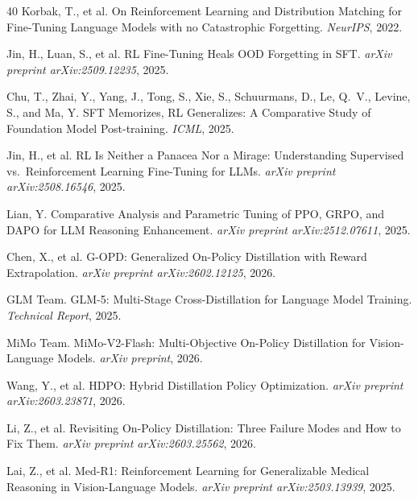 \documentclass{article}
\begin{document}
\begin{thebibliography}{40}
Korbak, T., et al.
\newblock On Reinforcement Learning and Distribution Matching for Fine-Tuning Language Models with no Catastrophic Forgetting.
\newblock \emph{NeurIPS}, 2022.

Jin, H., Luan, S., et al.
\newblock RL Fine-Tuning Heals OOD Forgetting in SFT.
\newblock \emph{arXiv preprint arXiv:2509.12235}, 2025.

Chu, T., Zhai, Y., Yang, J., Tong, S., Xie, S., Schuurmans, D., Le, Q.~V., Levine, S., and Ma, Y.
\newblock SFT Memorizes, RL Generalizes: A Comparative Study of Foundation Model Post-training.
\newblock \emph{ICML}, 2025.

Jin, H., et al.
\newblock RL Is Neither a Panacea Nor a Mirage: Understanding Supervised vs.\ Reinforcement Learning Fine-Tuning for LLMs.
\newblock \emph{arXiv preprint arXiv:2508.16546}, 2025.

Lian, Y.
\newblock Comparative Analysis and Parametric Tuning of PPO, GRPO, and DAPO for LLM Reasoning Enhancement.
\newblock \emph{arXiv preprint arXiv:2512.07611}, 2025.


Chen, X., et al.
\newblock G-OPD: Generalized On-Policy Distillation with Reward Extrapolation.
\newblock \emph{arXiv preprint arXiv:2602.12125}, 2026.

GLM Team.
\newblock GLM-5: Multi-Stage Cross-Distillation for Language Model Training.
\newblock \emph{Technical Report}, 2025.

MiMo Team.
\newblock MiMo-V2-Flash: Multi-Objective On-Policy Distillation for Vision-Language Models.
\newblock \emph{arXiv preprint}, 2026.

Wang, Y., et al.
\newblock HDPO: Hybrid Distillation Policy Optimization.
\newblock \emph{arXiv preprint arXiv:2603.23871}, 2026.

Li, Z., et al.
\newblock Revisiting On-Policy Distillation: Three Failure Modes and How to Fix Them.
\newblock \emph{arXiv preprint arXiv:2603.25562}, 2026.


Lai, Z., et al.
\newblock Med-R1: Reinforcement Learning for Generalizable Medical Reasoning in Vision-Language Models.
\newblock \emph{arXiv preprint arXiv:2503.13939}, 2025.


\end{thebibliography}
\end{document}
